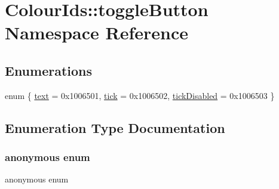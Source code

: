\hypertarget{namespaceColourIds_1_1toggleButton}{}\section{Colour\+Ids\+:\+:toggle\+Button Namespace Reference}
\label{namespaceColourIds_1_1toggleButton}
\subsection*{Enumerations}
\begin{DoxyCompactItemize}
\item 
enum \{ \mbox{\hyperlink{namespaceColourIds_1_1toggleButton_a3a6980ee37d256c78dbad2666177160cad43862b9074c9ddc13b4aa0b208ac5c1}{text}} = 0x1006501, 
\mbox{\hyperlink{namespaceColourIds_1_1toggleButton_a3a6980ee37d256c78dbad2666177160cac6aa83204bcc922e30115207bc429c40}{tick}} = 0x1006502, 
\mbox{\hyperlink{namespaceColourIds_1_1toggleButton_a3a6980ee37d256c78dbad2666177160caf29dd7591adad9e5e29332f462b355d8}{tick\+Disabled}} = 0x1006503
 \}
\end{DoxyCompactItemize}


\subsection{Enumeration Type Documentation}
\mbox{\label{namespaceColourIds_1_1toggleButton_a3a6980ee37d256c78dbad2666177160c}} 
\subsubsection{\texorpdfstring{anonymous enum}{anonymous enum}}
{\footnotesize\ttfamily anonymous enum}

